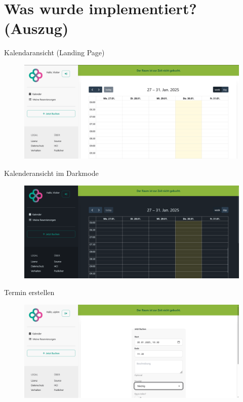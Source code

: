 \documentclass{sdqbeamer}
\begin{document}
    \section{Was wurde implementiert? (Auszug)}
    \begin{frame}{Kalendaransicht (Landing Page)}
        \thispagestyle{plain}
        \begin{figure}
            \centering
            \includegraphics[width=1\linewidth]{calendar.png}
            \label{fig:enter-label}
        \end{figure}
        
    \end{frame}
    
    \begin{frame}{Kalenderansicht im Darkmode}
        \thispagestyle{plain}
        \begin{figure}
            \centering
            \includegraphics[width=1\linewidth]{calendar_dark.png}
            \label{fig:enter-label}
        \end{figure}
    \end{frame}
    
    \begin{frame}{Termin erstellen}
        \thispagestyle{plain}
        \begin{figure}
            \centering
            \includegraphics[width=1\linewidth]{bookings_create_form_1.png}
            \label{fig:enter-label}
        \end{figure}
    \end{frame}
    
\end{document}
